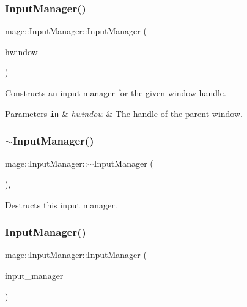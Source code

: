 \subsubsection{\texorpdfstring{Input\+Manager()}{InputManager()}\hspace{0.1cm}{\footnotesize\ttfamily [1/2]}}
{\footnotesize\ttfamily mage\+::\+Input\+Manager\+::\+Input\+Manager (\begin{DoxyParamCaption}\item[{H\+W\+ND}]{hwindow }\end{DoxyParamCaption})\hspace{0.3cm}{\ttfamily [protected]}}

Constructs an input manager for the given window handle.


\begin{DoxyParams}[1]{Parameters}
\mbox{\tt in}  & {\em hwindow} & The handle of the parent window. \\
\hline
\end{DoxyParams}
\hypertarget{classmage_1_1_input_manager_a287ca0e91ec079227c102f7eadd5bb46}{}\label{classmage_1_1_input_manager_a287ca0e91ec079227c102f7eadd5bb46} 
\subsubsection{\texorpdfstring{$\sim$\+Input\+Manager()}{~InputManager()}}
{\footnotesize\ttfamily mage\+::\+Input\+Manager\+::$\sim$\+Input\+Manager (\begin{DoxyParamCaption}{ }\end{DoxyParamCaption})\hspace{0.3cm}{\ttfamily [protected]}, {\ttfamily [virtual]}}

Destructs this input manager. \hypertarget{classmage_1_1_input_manager_ae97d703ccdec640027b1fa584073c650}{}\label{classmage_1_1_input_manager_ae97d703ccdec640027b1fa584073c650} 
\subsubsection{\texorpdfstring{Input\+Manager()}{InputManager()}\hspace{0.1cm}{\footnotesize\ttfamily [2/2]}}
{\footnotesize\ttfamily mage\+::\+Input\+Manager\+::\+Input\+Manager (\begin{DoxyParamCaption}\item[{const \hyperlink{classmage_1_1_input_manager}{Input\+Manager} \&}]{input\+\_\+manager }\end{DoxyParamCaption})\hspace{0.3cm}{\ttfamily [private]}}

